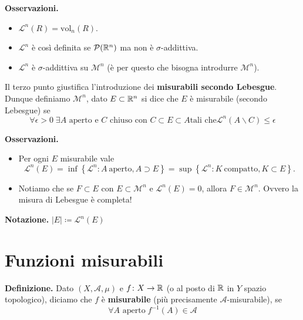\documentclass[a4paper, 12pt]{report}
\begin{document}
\textbf{Osservazioni.}
\begin{itemize}
	\item $\mathscr L^n(R) = \mathrm{vol}_n (R)$.
	\item $\mathscr L^n$ è così definita se $\mathcal{P}(\mathbb R^n)$ ma non è $\sigma$-addittiva.
	\item $\mathscr L^n$ è $\sigma$-addittiva su $\mathcal{M}^n$ (è per questo che bisogna introdurre $\mathcal{M}^n$).
\end{itemize}

Il terzo punto giustifica l'introduzione dei \textbf{misurabili secondo Lebesgue}. Dunque definiamo $\mathcal{M}^n$, dato $E \subset \mathbb R^n$ si dice che $E$ è misurabile (secondo Lebesgue) se
$$
\forall \epsilon > 0 \; \exists A \text{ aperto e } C \text{ chiuso con }
C \subset E \subset A 
\text{tali che}
\mathscr L^n (A \smallsetminus C) \leq \epsilon
$$

\textbf{Osservazioni.}
\begin{itemize}
	\item Per ogni $E$ misurabile vale
	\[
	\mathscr L^n(E) = \inf \left\{ \mathscr L^n \colon A \ \text{aperto}, A \supset E \right\} = \sup \left\{ \mathscr L^n \colon K \ \text{compatto}, K \subset E \right\}.
	\] 
	\item Notiamo che se $F \subset E$ con $E \subset \mathcal{M}^n$ e $\mathscr L^n(E) = 0$, allora $F \in \mathcal{M}^n$. Ovvero la misura di Lebesgue è completa!
\end{itemize}

\textbf{Notazione.} $\left| E \right| \coloneqq \mathscr L^n (E)$

\section{Funzioni misurabili}

\textbf{Definizione.}
Dato $(X, \mathcal{A}, \mu)$ e $f \colon X \to \mathbb R$ (o al posto di $\mathbb R$ in $Y$ spazio topologico), diciamo che $f$ è \textbf{misurabile} (più precisamente $\mathcal{A}$-misurabile), se
$$
\forall A \text{ aperto} \; f^{-1} (A) \in \mathcal{A}
$$ 

\newpage
\end{document}
